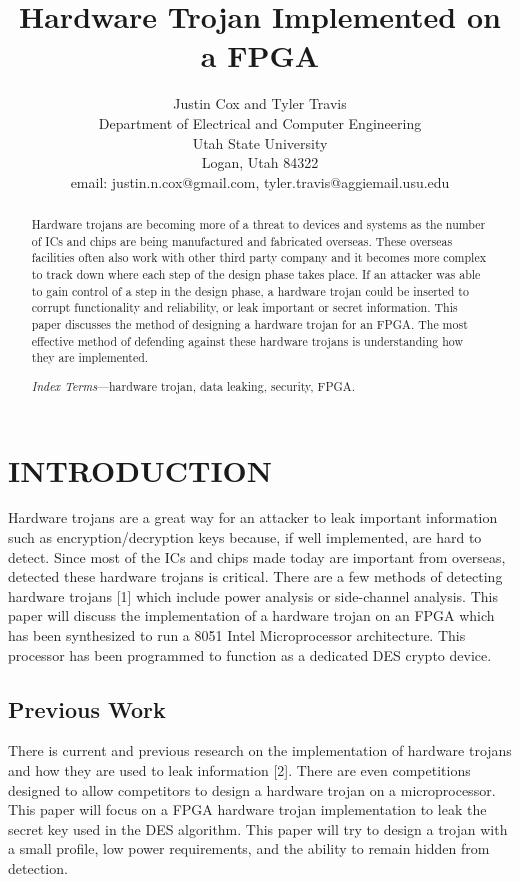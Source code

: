 \documentclass[letterpaper, 10 pt, conference]{ieeeconf}  %
\title{\LARGE \bf
Hardware Trojan Implemented on a FPGA  
}
\author{Justin Cox and Tyler Travis
\\ \small{Department of Electrical and Computer Engineering}
\\ \small{Utah State University}
\\ \small{Logan, Utah 84322}
\\ \small{email: justin.n.cox@gmail.com, tyler.travis@aggiemail.usu.edu}
}
\begin{document}
\maketitle
\thispagestyle{empty}
\pagestyle{empty}


\begin{abstract}

Hardware trojans are becoming more of a threat to devices and systems as the number of ICs and chips are being manufactured and fabricated overseas.  These overseas facilities often also work with other third party company and it becomes more complex to track down where each step of the design phase takes place.  If an attacker was able to gain control of a step in the design phase, a hardware trojan could be inserted to corrupt functionality and reliability, or leak important or secret information.  This paper discusses the method of designing a hardware trojan for an FPGA.  The most effective method of defending against these hardware trojans is understanding how they are implemented.

\emph{Index Terms}---hardware trojan, data leaking, security, FPGA.

\end{abstract}

\section{INTRODUCTION}

Hardware trojans are a great way for an attacker to leak important information such as encryption/decryption keys because, if well implemented, are hard to detect.  Since most of the ICs and chips made today are important from overseas, detected these hardware trojans is critical.  There are a few methods of detecting hardware trojans [1] which include power analysis or side-channel analysis.  This paper will discuss the implementation of a hardware trojan on an FPGA which has been synthesized to run a 8051 Intel Microprocessor architecture.  This processor has been programmed to function as a dedicated DES crypto device.   

\subsection{Previous Work}

There is current and previous research on the implementation of hardware trojans and how they are used to leak information [2].  There are even competitions designed to allow competitors to design a hardware trojan on a microprocessor.  This paper will focus on a FPGA hardware trojan implementation to leak the secret key used in the DES algorithm.  This paper will try to design a trojan with a small profile, low power requirements, and the ability to remain hidden from detection. 
\end{document}
